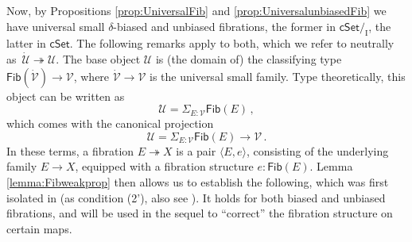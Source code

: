 \documentclass[11pt,reqno]{amsart}
\newcommand{\cSet}{\ensuremath{\mathsf{cSet}}}
\newcommand{\slice}[1]{\ensuremath{/_{\!{#1}}}}
\newcommand{\fib}{\ensuremath{\twoheadrightarrow}}
\renewcommand{\to}{\ensuremath{\rightarrow}}
\newcommand{\too}{\ensuremath{\longrightarrow}}
\newcommand{\I}{\ensuremath{\mathrm{I}}}
\newcommand{\U}{\ensuremath{\mathcal{U}}}
\newcommand{\UU}{\ensuremath{\,\dot{\mathcal{U}}}}
\newcommand{\V}{\ensuremath{\mathcal{V}}}
\newcommand{\VV}{\ensuremath{\dot{\mathcal{V}}}}
\newcommand{\Fib}{\ensuremath{\mathsf{Fib}}}
\theoremstyle{remark}
\theoremstyle{definition}
\begin{document}
Now, by Propositions \ref{prop:UniversalFib} and \ref{prop:UniversalunbiasedFib} we have universal small $\delta$-biased and unbiased fibrations, the former in $\cSet\slice{\I}$, the latter in $\cSet$.  The following remarks apply to both, which we refer to neutrally as $\UU \fib \U$.  The base object $\U$ is (the domain of) the classifying type $\mathsf{Fib}(\VV) \to \V$, where $\VV \to \V$ is the universal small family.  Type theoretically, this object can be written as
\[
\U = \Sigma_{E:\V}\Fib(E)\,,
\] 
which comes with the canonical projection
\[
\U = \Sigma_{E:\V}\Fib(E) \too \V\,.
\] 
In these terms, a fibration $E \fib X$ is a pair $\langle E, e \rangle$, consisting of the underlying family $E\to X$, equipped with a fibration structure $e :\Fib(E)$.
%
\noindent Lemma \ref{lemma:Fibweakprop}  then allows us to establish the following, which was first isolated in \cite{Shu:15}  (as condition (2'), also see \cite{GSS:22}). It holds for both biased and unbiased fibrations, and will be used in the sequel to ``correct'' the fibration structure on certain maps.
\end{document}
